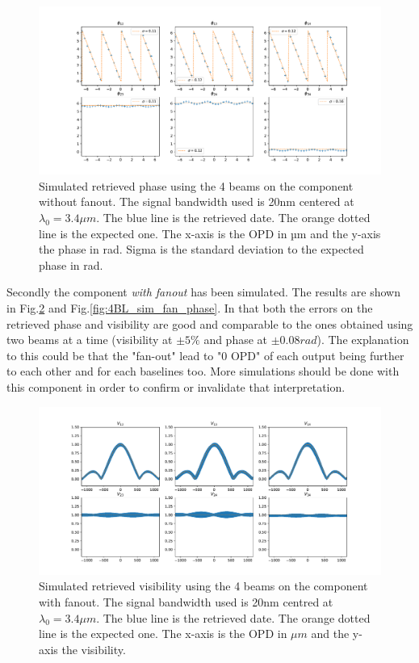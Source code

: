 \begin{figure}[htbp!]
\centering
\includegraphics[scale=.4]{../picture/4BL_20_nofan_phase.pdf}
\caption{Simulated retrieved phase using the 4 beams on the component without fanout. The signal bandwidth used is 20nm centered at $ \lambda_0=3.4 \mu m$. The blue line is the retrieved date. The orange dotted line is the expected one. The x-axis is the OPD in µm and the y-axis the phase in rad. Sigma is the standard deviation to the expected phase in rad.}
\label{fig:4BL_sim_nofan_phase}
\end{figure}

Secondly the component \emph{with fanout} has been simulated. The results are shown in Fig.\ref{fig:4BL_sim_fan} and Fig.\ref{fig:4BL_sim_fan_phase}. In that both the errors on the retrieved phase and visibility are good and comparable to the ones obtained using two beams at a time (visibility at $\pm 5\%$ and phase at $\pm 0.08 rad$). The explanation to this could be that the "fan-out" lead to "0 OPD" of each output being further to each other and for each baselines too. More simulations should be done with this component in order to confirm or invalidate that interpretation.  

\begin{figure}[htbp!]
\centering
\includegraphics[scale=.4]{../picture/4BL_20_fan.pdf}
\caption{Simulated retrieved visibility using the 4 beams on the component with fanout. The signal bandwidth used is 20nm centred at $ \lambda_0=3.4 \mu m$. The blue line is the retrieved date. The orange dotted line is the expected one. The x-axis is the OPD in $\mu m$ and the y-axis the visibility.}
\label{fig:4BL_sim_fan}
\end{figure}


